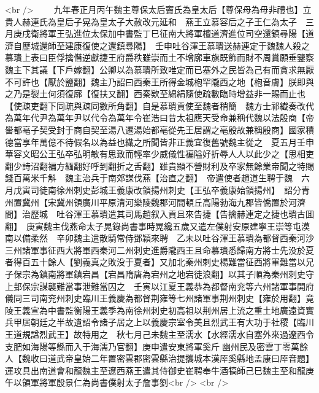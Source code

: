 <br />
　　九年春正月丙午魏主尊保太后竇氏為皇太后【尊保母為毋非禮也】立貴人赫連氏為皇后子晃為皇太子大赦改元延和　燕王立慕容后之子王仁為太子　三月庚戌衛將軍王弘進位太保加中書監丁巳征南大將軍檀道濟進位司空還鎮尋陽【道濟自歷城還師至建康復使之還鎮尋陽】　壬申吐谷渾王慕璝送赫連定于魏魏人殺之慕璝上表曰臣俘擒僭逆獻捷王府爵秩雖崇而土不增廓車旗既飾而財不周賞願垂鑒察魏主下其議【下戶嫁翻】公卿以為慕璝所致唯定而已塞外之民皆為己有而貪求無厭不可許也【厭於鹽翻】魏主乃詔曰西秦王所得金城枹罕隴西之地【枹音膚】朕即與之乃是裂土何須復廓【復扶又翻】西秦欵至綿絹隨使疏數臨時增益非一賜而止也【使疎吏翻下同疏與疎同數所角翻】自是慕璝貢使至魏者稍簡　魏方士祁纎奏改代為萬年代尹為萬年尹以代令為萬年令崔浩曰昔太祖應天受命兼稱代魏以法殷商【帝嚳都亳子契受封于商自契至湯八遷湯始都亳從先王居謂之亳殷故兼稱殷商】國家積德當享年萬億不待假名以為益也纎之所聞皆非正義宜復舊號魏主從之　夏五月壬申華容文昭公王弘卒弘明敏有思致而輕率少威儀性褊隘好折辱人人以此少之【思相吏翻少詩沼翻褊方緬翻好呼到翻折之舌翻】雖貴顯不營財利及卒家無餘業帝聞之特賜錢百萬米千斛　魏主治兵于南郊謀伐燕【治直之翻】　帝遣使者趙道生聘于魏　六月戊寅司徒南徐州刺史彭城王義康改領揚州刺史【王弘卒義康始領揚州】　詔分青州置冀州【宋冀州領廣川平原清河樂陵魏郡河間頓丘高陽勃海九郡皆僑置於河濟間】治歷城　吐谷渾王慕璝遣其司馬趙叙入貢且來告捷【告擒赫連定之捷也璝古囬翻】　庚寅魏主伐燕命太子晃錄尚書事時晃纔五歲又遣左僕射安原建寧王崇等屯漠南以備柔然　辛卯魏主遣散騎常侍鄧穎來聘　乙未以吐谷渾王慕璝為都督西秦河沙三州諸軍事征西大將軍西秦河二州刺史進爵隴西王且命慕璝悉歸南方將士先没於夏者得百五十餘人【劉義真之敗没于夏者】又加北秦州刺史楊難當征西將軍難當以兄子保宗為鎮南將軍鎮宕昌【宕昌隋唐為宕州之地宕徒浪翻】以其子順為秦州刺史守上邽保宗謀襲難當事泄難當囚之　壬寅以江夏王義恭為都督南兖等六州諸軍事開府儀同三司南兖州刺史臨川王義慶為都督荆雍等七州諸軍事荆州刺史【雍於用翻】竟陵王義宣為中書監衡陽王義季為南徐州刺史初高祖以荆州居上流之重土地廣遠資實兵甲居朝廷之半故遺詔令諸子居之上以義慶宗室令美且烈武王有大功于社稷【臨川王道規諡烈武王】故特用之　秋七月己未魏主至濡水【水經濡水自塞外來過遼西令支肥如海陽等縣而入于海濡乃官翻】庚申遣安東將軍奚斤幽州民及密雲丁零萬餘人【魏收曰道武帝皇始二年置密雲郡密雲縣治提攜城本漢厗奚縣地孟康曰厗音題】運攻具出南道會和龍魏主至遼西燕王遣其侍御史崔聘奉牛酒犒師己巳魏主至和龍庚午以領軍將軍殷景仁為尚書僕射太子詹事劉<br />
<br />
